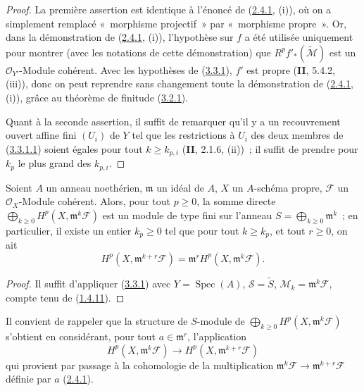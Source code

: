 \begin{proof}
La première assertion est identique à l'énoncé de
(\hyperref[III.2.4.1-fr]{2.4.1}, (i)), où on a simplement remplacé
«~morphisme projectif~» par «~morphisme propre~». Or, dans la démonstration
de (\hyperref[III.2.4.1-fr]{2.4.1}, (i)), l'hypothèse sur $f$ a été utilisée
uniquement pour montrer (avec les notations de cette démonstration) que
$R^pf'_*(\widetilde{\mathcal M})$ est un $\mathcal O_{Y'}$-Module cohérent.
Avec les hypothèses de (\hyperref[III.3.3.1-fr]{3.3.1}), $f'$ est propre
(\textbf{II}, 5.4.2, (iii)), donc on peut reprendre sans changement toute la
démonstration de (\hyperref[III.2.4.1-fr]{2.4.1}, (i)), grâce au théorème de
finitude (\hyperref[III.3.2.1-fr]{3.2.1}).

Quant à la seconde assertion, il suffit de remarquer qu'il y a un
recouvrement ouvert affine fini $(U_i)$ de $Y$ tel que les restrictions à
$U_i$ des deux membres de
(\hyperref[III.3.3.1.1-fr]{3.3.1.1}) soient égales pour tout
$k\geq k_{p,i}$ (\textbf{II}, 2.1.6, (ii))~; il suffit de prendre pour $k_p$ le plus
grand des $k_{p,i}$.
\end{proof}

\begin{corollary}[3.3.2]
\label{III.3.3.2-fr}
Soient $A$ un anneau noethérien, $\mathfrak m$ un idéal de $A$, $X$ un
$A$-schéma propre, $\mathcal F$ un $\mathcal O_X$-Module cohérent. Alors,
pour tout $p\geq0$, la somme directe
$\bigoplus_{k\geq0}H^p(X,\mathfrak m^k\mathcal F)$ est un module de type fini
sur l'anneau $S=\bigoplus_{k\geq0}\mathfrak m^k$~; en particulier, il existe
un entier $k_p\geq0$ tel que pour tout $k\geq k_p$, et tout $r\geq0$, on ait
\[
H^p(X,\mathfrak m^{k+r}\mathcal F)
=\mathfrak m^rH^p(X,\mathfrak m^k\mathcal F).
\tag{3.3.2.1}\label{III.3.3.2.1-fr}
\]
\end{corollary}

\begin{proof}
Il suffit d'appliquer (\hyperref[III.3.3.1-fr]{3.3.1}) avec
$Y=\operatorname{Spec}(A)$, $\mathcal S=\widetilde S$,
$\mathcal M_k=\mathfrak m^k\mathcal F$, compte tenu de
(\hyperref[III.1.4.11-fr]{1.4.11}).
\end{proof}

Il convient de rappeler que la structure de $S$-module de
$\bigoplus_{k\geq0}H^p(X,\mathfrak m^k\mathcal F)$ s'obtient en considérant,
pour tout $a\in\mathfrak m^r$, l'application
\[
H^p(X,\mathfrak m^k\mathcal F)
\longrightarrow H^p(X,\mathfrak m^{k+r}\mathcal F)
\]
qui provient par passage à la cohomologie de la multiplication
$\mathfrak m^k\mathcal F\to\mathfrak m^{k+r}\mathcal F$ définie par $a$
(\hyperref[III.2.4.1-fr]{2.4.1}).

